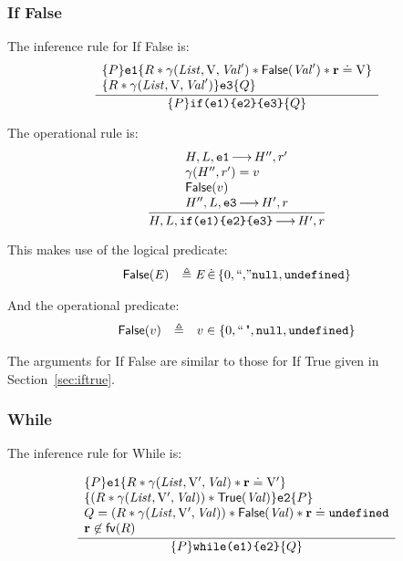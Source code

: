 \documentclass{article}
\begin{document}
\subsubsection{If False}
\label{sec:iffalse}

The inference rule for If False is:
\[\frac
{\begin{array}{l} \tr P {\js{e1}}{R \sep \getValue(\E{List},\LVAL,\E{Val}')\sep \isfalse(\E{Val}')\sep\rv\doteq\LVAL} \\
    \tr {R  \sep \getValue(\E{List},\LVAL,\E{Val}')}{\js{e3}} Q\end{array}}
{\tr P {\js{if(e1)\{e2\}\{e3\}}} Q}
\]

The operational rule is:
\[\frac
{
\begin{array}{l}
 H,L,\js{e1} \levalsto H'',\njs{r'} \\
 \getValue(H'',\njs{r'})=\njs{v} \\
 \isfalse(\njs{v}) \\
 H'',L,\js{e3} \levalsto H',\njs{r}
\end{array}}
{H,L,\js{if(e1)\{e2\}\{e3\}} \levalsto H',\njs{r}}
\]

This makes use of the logical predicate:
\[
\begin{array}{ll}
        \isfalse(\E{E}) &\triangleq \E{E}\dotin\{0,\str,\nil,\und\}
\end{array}
\]

And the operational predicate:
\[\begin{array}{rll}
        \isfalse(v)&\triangleq &v\in\falsity
\end{array}\]

The arguments for If False are similar to those for If True given in Section~\ref{sec:iftrue}.

\subsubsection{While}

The inference rule for While is:

\[\frac
{\begin{array}{l}
        \tr P {\js{e1}} {R \sep \getValue(\E{List},\LVAL',\E{Val})\sep\rv\doteq\LVAL'} \\ 
    \tr {(R\sep\getValue(\E{List},\LVAL',\E{Val})) \sep \istrue(\E{Val})} {\js{e2}} P\\
Q = (R\sep\getValue(\E{List},\LVAL',\E{Val})) \sep \isfalse(\E{Val})\sep\rv\doteq\und\\
\rv\not\in \fv(R)\end{array}}
{\tr P {\js{while(e1)\{e2\}}} Q}
\]
\end{document}
